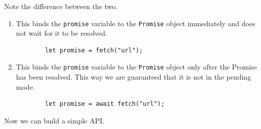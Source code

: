 \documentclass{article}
\begin{document}
    Note the difference between the two. 
    \begin{enumerate}
      \item This binds the \texttt{promise} variable to the \texttt{Promise} object immediately and does not wait for it to be resolved. 
      \begin{lstlisting}
        let promise = fetch("url"); 
      \end{lstlisting}

      \item This binds the \texttt{promise} variable to the \texttt{Promise} object only after the Promise has been resolved. This way we are guaranteed that it is not in the pending mode. 
      \begin{lstlisting}
        let promise = await fetch("url"); 
      \end{lstlisting}
    \end{enumerate}

    Now we can build a simple API. 
\end{document}
